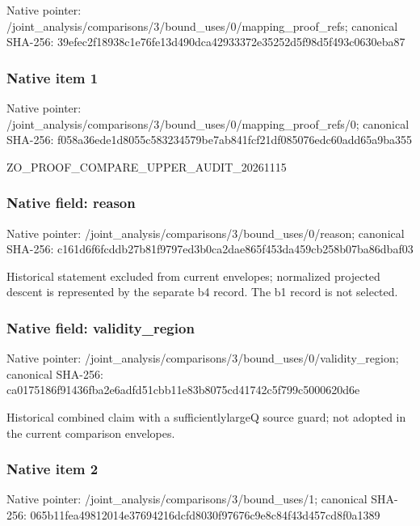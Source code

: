 \documentclass[10pt,a4paper]{article}
\begin{document}
Native pointer: /joint\_analysis/comparis\allowbreak{}ons/3/bound\_uses/0/mappi\allowbreak{}ng\_proof\_refs; canonical SHA-256: 39efec2f18938c1e76fe13d4\allowbreak{}90dca42933372e35252d5f98\allowbreak{}d5f493c0630eba87



\subsubsection{Native item 1}


Native pointer: /joint\_analysis/comparis\allowbreak{}ons/3/bound\_uses/0/mappi\allowbreak{}ng\_proof\_refs/0; canonical SHA-256: f058a36ede1d8055c5832345\allowbreak{}79be7ab841fcf21df085076e\allowbreak{}dc60add65a9ba355


ZO\_PROOF\_COMPARE\_UPPER\_AUDIT\_20261115


\subsubsection{Native field: reason}


Native pointer: /joint\_analysis/comparis\allowbreak{}ons/3/bound\_uses/0/reaso\allowbreak{}n; canonical SHA-256: c161d6f6fcddb27b81f9797e\allowbreak{}d3b0ca2dae865f453da459cb\allowbreak{}258b07ba86dbaf03


Historical statement excluded from current envelopes; normalized projected descent is represented by the separate b4 record. The b1 record is not selected.


\subsubsection{Native field: validity\_region}


Native pointer: /joint\_analysis/comparis\allowbreak{}ons/3/bound\_uses/0/valid\allowbreak{}ity\_region; canonical SHA-256: ca0175186f91436fba2e6adf\allowbreak{}d51cbb11e83b8075cd41742c\allowbreak{}5f799c5000620d6e


Historical combined claim with a sufficientlylargeQ source guard; not adopted in the current comparison envelopes.


\subsubsection{Native item 2}


Native pointer: /joint\_analysis/comparis\allowbreak{}ons/3/bound\_uses/1; canonical SHA-256: 065b11fea49812014e376942\allowbreak{}16dcfd8030f97676c9e8c84f\allowbreak{}43d457cd8f0a1389
\end{document}
